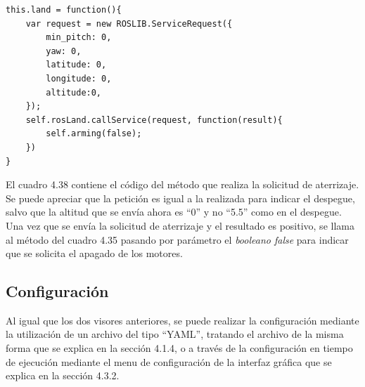 \begin{lstlisting}[caption= Método para cambiar el modo de pilotaje, label=cod.setMode]
this.land = function(){
	var request = new ROSLIB.ServiceRequest({
		min_pitch: 0,
		yaw: 0,
		latitude: 0,
		longitude: 0,
		altitude:0,
	});
	self.rosLand.callService(request, function(result){
		self.arming(false);
	})
}
\end{lstlisting}

El cuadro 4.38 contiene el código del método que realiza la solicitud de aterrizaje. Se puede apreciar que la petición es igual a la realizada para indicar el despegue, salvo que la altitud que se envía ahora es ``0'' y no ``5.5'' como en el despegue. Una vez que se envía la solicitud de aterrizaje y el resultado es positivo, se llama al método del cuadro 4.35 pasando por parámetro el \textit{booleano false} para indicar que se solicita el apagado de los motores.

\subsection{Configuración}
Al igual que los dos visores anteriores, se puede realizar la configuración mediante la utilización de un archivo del tipo ``YAML'', tratando el archivo de la misma forma que se explica en la sección 4.1.4,  o a través de la configuración en tiempo de ejecución mediante el menu de configuración de la interfaz gráfica que se explica en la sección 4.3.2.

